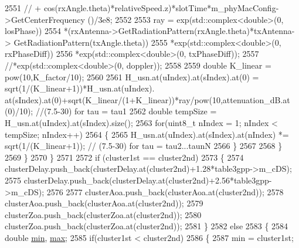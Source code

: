 \begin{DoxyCode}
2551                                 \textcolor{comment}{//              +
       cos(rxAngle.theta)*relativeSpeed.z)*slotTime*m\_phyMacConfig->GetCenterFrequency ()/3e8;}
2552 
2553                                 ray = exp(std::complex<double>(0, losPhase))
2554                                                 *(rxAntenna->GetRadiationPattern(rxAngle.theta)*txAntenna->
      GetRadiationPattern(txAngle.theta))
2555                                                 *exp(std::complex<double>(0, rxPhaseDiff))
2556                                                 *exp(std::complex<double>(0, txPhaseDiff));
2557                                                 \textcolor{comment}{//*exp(std::complex<double>(0, doppler));}
2558 
2559                                 \textcolor{keywordtype}{double} K\_linear = pow(10,K\_factor/10);
2560 
2561                                 H\_usn.at(uIndex).at(sIndex).at(0) = sqrt(1/(K\_linear+1))*H\_usn.at(uIndex).
      at(sIndex).at(0)+sqrt(K\_linear/(1+K\_linear))*ray/pow(10,attenuation\_dB.at (0)/10);  \textcolor{comment}{//(7.5-30) for tau = tau1}
2562                                 \textcolor{keywordtype}{double} tempSize = H\_usn.at(uIndex).at(sIndex).size();
2563                                 \textcolor{keywordflow}{for}(uint8\_t nIndex = 1; nIndex < tempSize; nIndex++)
2564                                 \{
2565                                         H\_usn.at(uIndex).at(sIndex).at(nIndex) *= sqrt(1/(K\_linear+1)); \textcolor{comment}{//
      (7.5-30) for tau = tau2...taunN}
2566                                 \}
2567 
2568                         \}
2569                 \}
2570         \}
2571 
2572         \textcolor{keywordflow}{if} (cluster1st == cluster2nd)
2573         \{
2574                 clusterDelay.push\_back(clusterDelay.at(cluster2nd)+1.28*table3gpp->m\_cDS);
2575                 clusterDelay.push\_back(clusterDelay.at(cluster2nd)+2.56*table3gpp->m\_cDS);
2576 
2577                 clusterAoa.push\_back(clusterAoa.at(cluster2nd));
2578                 clusterAoa.push\_back(clusterAoa.at(cluster2nd));
2579                 clusterZoa.push\_back(clusterZoa.at(cluster2nd));
2580                 clusterZoa.push\_back(clusterZoa.at(cluster2nd));
2581         \}
2582         \textcolor{keywordflow}{else}
2583         \{
2584                 \textcolor{keywordtype}{double} \hyperlink{80211b_8c_ac6afabdc09a49a433ee19d8a9486056d}{min}, \hyperlink{80211b_8c_affe776513b24d84b39af8ab0930fef7f}{max};
2585                 \textcolor{keywordflow}{if}(cluster1st < cluster2nd)
2586                 \{
2587                         min = cluster1st;

\end{DoxyCode}
